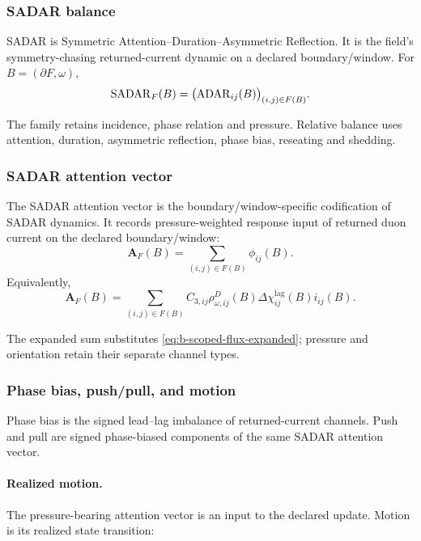 \subsubsection{SADAR balance}\label{subsec:sadar-balance}
\begin{definition}[SADAR]
SADAR is Symmetric Attention--Duration--Asymmetric Reflection. It is the field's symmetry-chasing returned-current dynamic on a declared boundary/window. For \(B=(\partial F,\omega)\),
\begin{equation}
\mathrm{SADAR}_F(B)=
\big(\mathrm{ADAR}_{ij}(B)\big)_{(i,j)\in F(B)}.
\label{eq:sadar-field}
\end{equation}
\end{definition}
The family retains incidence, phase relation and pressure. Relative balance
uses attention, duration, asymmetric reflection, phase bias, reseating and shedding.

\subsubsection{SADAR attention vector}\label{subsec:sadar-attention-vector}
\begin{definition}
The SADAR attention vector is the boundary/window-specific codification of SADAR dynamics. It records pressure-weighted response input of returned duon current on the declared boundary/window:
\begin{equation}
\mathbf A_F(B)=
\sum_{(i,j)\in F(B)}
\phi_{ij}(B).
\label{eq:sadar-attention-vector}
\end{equation}
Equivalently,
\begin{equation}
\mathbf A_F(B)=
\sum_{(i,j)\in F(B)}
C_{3,ij}\rho^D_{\omega,ij}(B)
\Delta\chi^{\mathrm{lag}}_{ij}(B)i_{ij}(B).
\label{eq:sadar-attention-vector-expanded}
\end{equation}
\end{definition}
The expanded sum substitutes \eqref{eq:b-scoped-flux-expanded}; pressure and
orientation retain their separate channel types.

\subsubsection{Phase bias, push/pull, and motion}\label{subsec:phase-bias-motion}
Phase bias is the signed lead--lag imbalance of returned-current channels. Push and pull are signed phase-biased components of the same SADAR attention vector.
\paragraph{Realized motion.}
The pressure-bearing attention vector is an input to the declared update.
Motion is its realized state transition:

